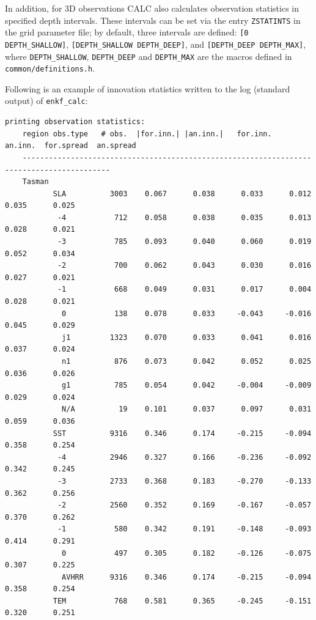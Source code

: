 \documentclass[11pt]{report}
\begin{document}
In addition, for 3D observations CALC also calculates observation statistics in specified depth intervals.
These intervals can be set via the entry \verb|ZSTATINTS| in the grid parameter file; by default, three intervals are defined: \verb|[0 DEPTH_SHALLOW]|, \verb|[DEPTH_SHALLOW DEPTH_DEEP]|, and \verb|[DEPTH_DEEP DEPTH_MAX]|, where \verb|DEPTH_SHALLOW|, \verb|DEPTH_DEEP| and \verb|DEPTH_MAX| are the macros defined in \verb|common/definitions.h|.

Following is an example of innovation statistics written to the log (standard output) of \verb|enkf_calc|:
\begin{Verbatim}[frame=single,fontsize=\footnotesize]
  printing observation statistics:
    region obs.type   # obs.  |for.inn.| |an.inn.|   for.inn.   an.inn.  for.spread  an.spread
    ------------------------------------------------------------------------------------------
    Tasman
           SLA          3003    0.067      0.038      0.033      0.012      0.035      0.025  
            -4           712    0.058      0.038      0.035      0.013      0.028      0.021  
            -3           785    0.093      0.040      0.060      0.019      0.052      0.034  
            -2           700    0.062      0.043      0.030      0.016      0.027      0.021  
            -1           668    0.049      0.031      0.017      0.004      0.028      0.021  
             0           138    0.078      0.033     -0.043     -0.016      0.045      0.029  
             j1         1323    0.070      0.033      0.041      0.016      0.037      0.024  
             n1          876    0.073      0.042      0.052      0.025      0.036      0.026  
             g1          785    0.054      0.042     -0.004     -0.009      0.029      0.024  
             N/A          19    0.101      0.037      0.097      0.031      0.059      0.036  
           SST          9316    0.346      0.174     -0.215     -0.094      0.358      0.254  
            -4          2946    0.327      0.166     -0.236     -0.092      0.342      0.245  
            -3          2733    0.368      0.183     -0.270     -0.133      0.362      0.256  
            -2          2560    0.352      0.169     -0.167     -0.057      0.370      0.262  
            -1           580    0.342      0.191     -0.148     -0.093      0.414      0.291  
             0           497    0.305      0.182     -0.126     -0.075      0.307      0.225  
             AVHRR      9316    0.346      0.174     -0.215     -0.094      0.358      0.254  
           TEM           768    0.581      0.365     -0.245     -0.151      0.320      0.251  

\end{Verbatim}
\end{document}
